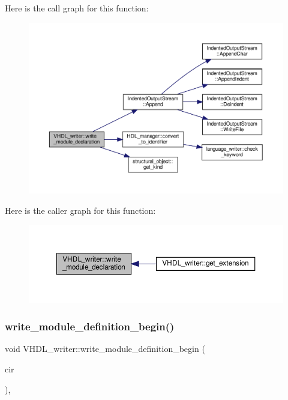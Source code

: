 Here is the call graph for this function\+:
\nopagebreak
\begin{figure}[H]
\begin{center}
\leavevmode
\includegraphics[width=350pt]{d0/d0c/structVHDL__writer_a9387c719414e8fb4e8b086ce9d9bc500_cgraph}
\end{center}
\end{figure}
Here is the caller graph for this function\+:
\nopagebreak
\begin{figure}[H]
\begin{center}
\leavevmode
\includegraphics[width=350pt]{d0/d0c/structVHDL__writer_a9387c719414e8fb4e8b086ce9d9bc500_icgraph}
\end{center}
\end{figure}
\mbox{\label{structVHDL__writer_a36282fe093991df0bd1b5c1df8466fd6}} 
\subsubsection{\texorpdfstring{write\+\_\+module\+\_\+definition\+\_\+begin()}{write\_module\_definition\_begin()}}
{\footnotesize\ttfamily void V\+H\+D\+L\+\_\+writer\+::write\+\_\+module\+\_\+definition\+\_\+begin (\begin{DoxyParamCaption}\item[{const \hyperlink{structural__objects_8hpp_a8ea5f8cc50ab8f4c31e2751074ff60b2}{structural\+\_\+object\+Ref} \&}]{cir }\end{DoxyParamCaption})\hspace{0.3cm}{\ttfamily [override]}, {\ttfamily [virtual]}}



